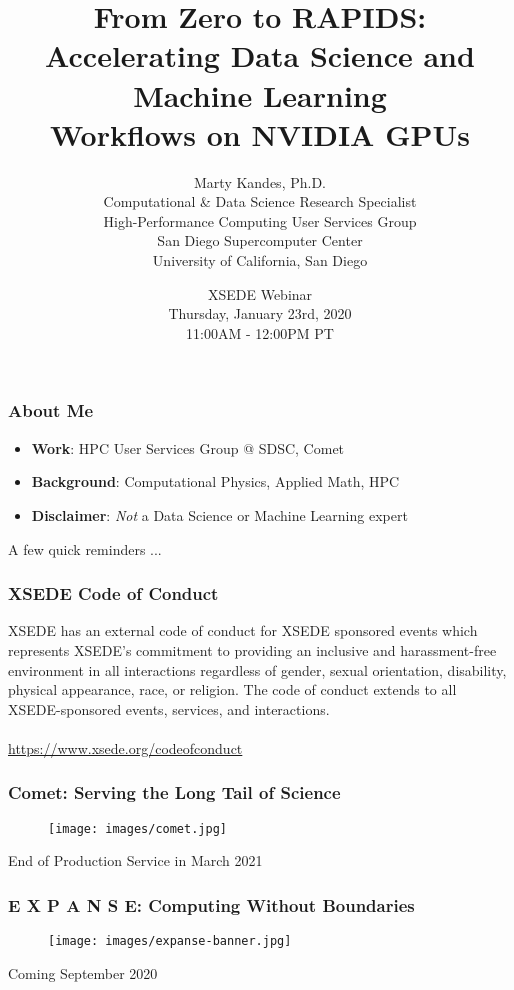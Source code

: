 \documentclass{beamer}
\title{From Zero to RAPIDS: \\
       Accelerating Data Science and Machine Learning \\
       Workflows on NVIDIA GPUs}
\author{Marty Kandes, Ph.D. \\
   Computational \& Data Science Research Specialist \\
   High-Performance Computing User Services Group \\ 
   San Diego Supercomputer Center \\
   University of California, San Diego}
\date{XSEDE Webinar \\
   Thursday, January 23rd, 2020 \\
   11:00AM - 12:00PM PT}
\begin{document}
\maketitle

\begin{frame}
   \frametitle{About Me}
   \begin{itemize}
      \setlength\itemsep{1.5em}
      \item \textbf{Work}: HPC User Services Group @ SDSC, Comet
      \item \textbf{Background}: Computational Physics, Applied Math, HPC
      \item \textbf{Disclaimer}: \textit{Not} a Data Science or Machine Learning expert
   \end{itemize}
\end{frame}

\begin{frame}
   A few quick reminders ...
\end{frame}

\begin{frame}
   \frametitle{XSEDE Code of Conduct}
   XSEDE has an external code of conduct for XSEDE sponsored events 
   which represents XSEDE's commitment to providing an inclusive and 
   harassment-free environment in all interactions regardless of gender,
   sexual orientation, disability, physical appearance, race, or 
   religion. The code of conduct extends to all XSEDE-sponsored events,
   services, and interactions.
   \\ \ \\
   \url{https://www.xsede.org/codeofconduct}
\end{frame}

\begin{frame}
   \frametitle{Comet: Serving the Long Tail of Science}
   \vspace{-1.0em}
   \begin{figure}[htbp]
      \texttt{[image: images/comet.jpg]}
   \end{figure}
   \begin{center}
      End of Production Service in March 2021
   \end{center}
\end{frame}

\begin{frame}
   \frametitle{E X P A N S E: Computing Without Boundaries}
   \vspace{-1.0em}
   \begin{figure}[htbp]
      \texttt{[image: images/expanse-banner.jpg]}
   \end{figure}
   \begin{center}
      Coming September 2020
   \end{center}
\end{frame}
\end{document}
